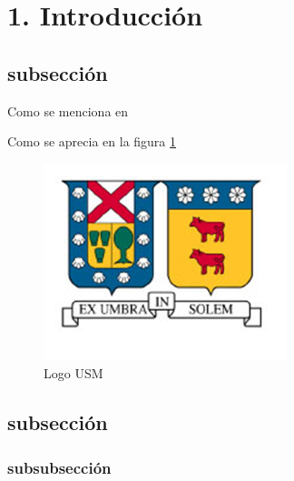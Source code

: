 \section{1. Introducción}
\subsection{subsección}

Como se menciona en \cite{method}\cite{modnegweb}\cite{modnegweb2}

Como se aprecia en la figura \ref{usm}

\begin{figure}[H]
\centering
\includegraphics[scale=1]{fig/usmLogo.png}
\caption{Logo USM}
\label{usm}
\end{figure}

\subsection{subsección}

\subsubsection{subsubsección}
